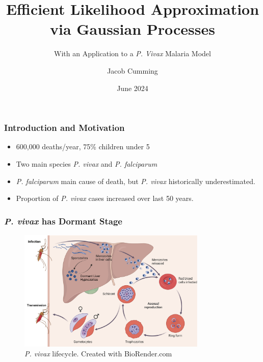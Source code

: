 \documentclass{beamer}
\title{Efficient Likelihood Approximation via Gaussian Processes}
\subtitle{With an Application to a \emph{P. Vivax} Malaria Model}
\author{Jacob Cumming}
\institute{University of Melbourne, Walter and Eliza Hall Institute}
\date{June 2024}
\begin{document}
\frame{\titlepage}


\begin{frame}
    \frametitle{Introduction and Motivation}
    \begin{itemize}
        \item 600,000 deaths/year, 75\% children under 5
        \item Two main species \emph{P. vivax} and \emph{P. falciparum}
        \item \emph{P. falciparum} main cause of death, but
              \emph{P. vivax} historically underestimated.
        \item Proportion of \emph{P. vivax} cases increased over last 50 years.
    \end{itemize}
\end{frame}

\begin{frame}
    \frametitle{\emph{P. vivax} has Dormant Stage}
    \begin{figure}
        \centering
        \includegraphics[width=0.8\textwidth]{vivax_lifecycle_full.pdf}
        \caption{\emph{P. vivax} lifecycle. Created with BioRender.com}
    \end{figure}
\end{frame}
\end{document}
